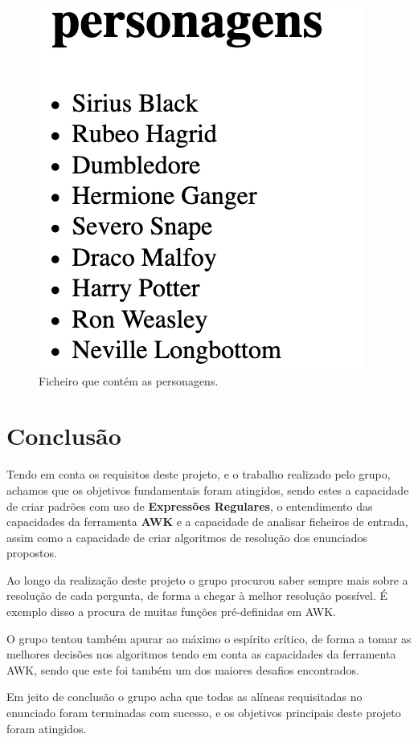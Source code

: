 \documentclass[11pt,a4paper]{report}
\begin{document}
\begin{figure}[H]
\centering
\includegraphics[scale=0.6]{personagens_resultado.png}
\caption{Ficheiro que contém as personagens.}
\label{img:personagens_resultados}
\end{figure}


\chapter{Conclusão}
\label{chap:concl}

Tendo em conta os requisitos deste projeto, e o trabalho realizado pelo grupo, achamos que os objetivos fundamentais foram atingidos, sendo estes a capacidade de criar padrões com uso de \textbf{Expressões Regulares}, o entendimento das capacidades da ferramenta \textbf{AWK} e a capacidade de analisar ficheiros de entrada, assim como a capacidade de criar algoritmos de resolução dos enunciados propostos.

Ao longo da realização deste projeto o grupo procurou saber sempre mais sobre a resolução de cada pergunta, de forma a chegar à melhor resolução possível. É exemplo disso a procura de muitas funções pré-definidas em AWK.

O grupo tentou também apurar ao máximo o espírito crítico, de forma a tomar as melhores decisões nos algoritmos tendo em conta as capacidades da ferramenta AWK, sendo que este foi também um dos maiores desafios encontrados.

Em jeito de conclusão o grupo acha que todas as alíneas requisitadas no enunciado foram terminadas com sucesso, e os objetivos principais deste projeto foram atingidos.
\end{document}
